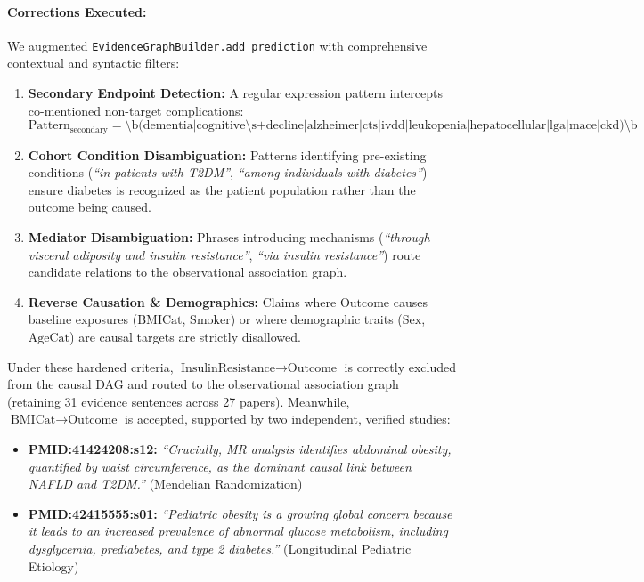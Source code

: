 \documentclass[11pt,a4paper]{article}
\begin{document}
\paragraph{Corrections Executed:}
We augmented \texttt{EvidenceGraphBuilder.add\_prediction} with comprehensive contextual and syntactic filters:
\begin{enumerate}[leftmargin=1.5em]
    \item \textbf{Secondary Endpoint Detection:} A regular expression pattern intercepts co-mentioned non-target complications:
    \begin{equation*}
        \text{Pattern}_{\text{secondary}} = \text{\textbackslash b(dementia|cognitive\textbackslash s+decline|alzheimer|cts|ivdd|leukopenia|hepatocellular|lga|mace|ckd)\textbackslash b}
    \end{equation*}
    \item \textbf{Cohort Condition Disambiguation:} Patterns identifying pre-existing conditions (\textit{``in patients with T2DM''}, \textit{``among individuals with diabetes''}) ensure diabetes is recognized as the patient population rather than the outcome being caused.
    \item \textbf{Mediator Disambiguation:} Phrases introducing mechanisms (\textit{``through visceral adiposity and insulin resistance''}, \textit{``via insulin resistance''}) route candidate relations to the observational association graph.
    \item \textbf{Reverse Causation \& Demographics:} Claims where $\text{Outcome}$ causes baseline exposures ($\text{BMICat}$, $\text{Smoker}$) or where demographic traits ($\text{Sex}$, $\text{AgeCat}$) are causal targets are strictly disallowed.
\end{enumerate}
Under these hardened criteria, $\text{InsulinResistance} \rightarrow \text{Outcome}$ is correctly excluded from the causal DAG and routed to the observational association graph (retaining 31 evidence sentences across 27 papers). Meanwhile, $\text{BMICat} \rightarrow \text{Outcome}$ is accepted, supported by two independent, verified studies:
\begin{itemize}[leftmargin=1.5em]
    \item \textbf{PMID:41424208:s12:} \textit{``Crucially, MR analysis identifies abdominal obesity, quantified by waist circumference, as the dominant causal link between NAFLD and T2DM.''} (Mendelian Randomization)
    \item \textbf{PMID:42415555:s01:} \textit{``Pediatric obesity is a growing global concern because it leads to an increased prevalence of abnormal glucose metabolism, including dysglycemia, prediabetes, and type 2 diabetes.''} (Longitudinal Pediatric Etiology)
\end{itemize}
\end{document}
